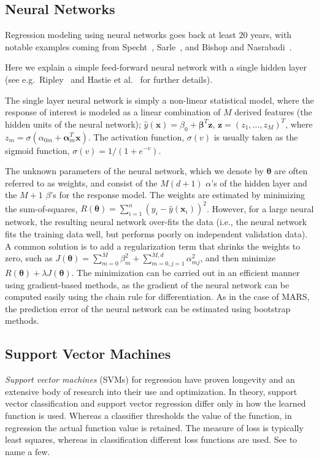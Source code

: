 \subsection{Neural Networks}
Regression modeling using neural networks goes back at least $20$ years, with notable examples coming from Specht~\cite{Specht1991}, Sarle~\cite{Sarle1994}, and Bishop and Nasrabadi~\cite{BishopNasrabadi2006}.

Here we explain a simple feed-forward neural network with a single hidden layer (see e.g.\ Ripley~\cite{Ripley1996} and Hastie et al.~\cite{HastieTibshiraniFriedman2008} for further details).

The single layer neural network is simply a non-linear statistical model, where the response of interest is modeled as a linear combination of $M$ derived features (the hidden units of the neural network);
%
$\hat{y}(\mathbf{x}) = \beta_0 + \mathbf{\beta}^T \mathbf{z}$, $\mathbf{z} = (z_1, \dots, z_M)^T$, where $z_m = \sigma(\alpha_{0m} + \mathbf{\alpha}_m^T \mathbf{x})$.
%
The activation function, $\sigma(v)$ is usually taken as the sigmoid function, $\sigma(v) = 1/(1+e^{-v})$.

The unknown parameters of the neural network, which we denote by $\mathbf{\theta}$ are often referred to as weights, and consist of the $M(d+1)$ $\alpha$'s of the hidden layer and the $M+1$ $\beta$'s for the response model.
%
The weights are estimated by minimizing the sum-of-squares, $R(\mathbf{\theta}) = \sum_{i=1}^n (y_i - \hat{y}(\mathbf{x}_i))^2$.
%
However, for a large neural network, the resulting neural network over-fits the data (i.e., the neural network fits the training data well, but performs poorly on independent validation data).
%
A common solution is to add a regularization term that shrinks the weights to zero, such as $J(\mathbf{\theta}) = \sum_{m=0}^M \beta_{m}^2 + \sum_{m=0,j=1}^{M,d} \alpha_{mj}^2$, and then minimize $R(\mathbf{\theta}) + \lambda J(\mathbf{\theta})$.
%
The minimization can be carried out in an efficient manner using gradient-based methods, as the gradient of the neural network can be computed easily using the chain rule for differentiation.
%
As in the case of MARS, the prediction error of the neural network can be estimated using bootstrap methods.

\subsection{Support Vector Machines}
\emph{Support vector machines} (SVMs) for regression have proven longevity and an extensive body of research into their use and optimization.
%
In theory, support vector classification and support vector regression differ only in how the learned function is used.
%
Whereas a classifier thresholds the value of the function, in regression the actual function value is retained.
%
The measure of loss is typically least squares, whereas in classification different loss functions are used.
%
See \cite{SmolaScholkopf2004,SuykensVandewalle1999,SuykensDeBrabanterLukas2002,DruckerBurgesKaufman1997} to name a few.

